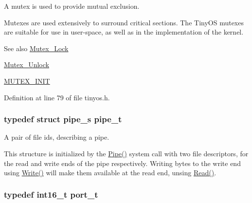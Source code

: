 A mutex is used to provide mutual exclusion. 

Mutexes are used extensively to surround critical sections. The Tiny\+OS mutexes are suitable for use in user-\/space, as well as in the implementation of the kernel.

\begin{DoxySeeAlso}{See also}
\hyperlink{group__syscalls_ga1140be44df71d39edaf6a7262fb763ca}{Mutex\+\_\+\+Lock} 

\hyperlink{group__syscalls_ga0b98d0315d0931d0c28104c36dd559c9}{Mutex\+\_\+\+Unlock} 

\hyperlink{group__syscalls_ga96be0bfc33e7e113099c7546798bec99}{M\+U\+T\+E\+X\+\_\+\+I\+N\+IT} 
\end{DoxySeeAlso}


Definition at line 79 of file tinyos.\+h.

\subsubsection[{\texorpdfstring{pipe\+\_\+t}{pipe_t}}]{\setlength{\rightskip}{0pt plus 5cm}typedef struct {\bf pipe\+\_\+s}  {\bf pipe\+\_\+t}}\hypertarget{group__syscalls_gad56b5ceaaf7d3ab88b4be7f622314dfb}{}\label{group__syscalls_gad56b5ceaaf7d3ab88b4be7f622314dfb}


A pair of file ids, describing a pipe. 

This structure is initialized by the {\ttfamily \hyperlink{group__syscalls_gab6355ce54e047c31538ed5ed9108b5b3}{Pipe()}} system call with two file descriptors, for the read and write ends of the pipe respectively. Writing bytes to the write end using {\ttfamily \hyperlink{group__syscalls_gaf046f003fde24f79fb395c250137856c}{Write()}} will make them available at the read end, unsing {\ttfamily \hyperlink{group__syscalls_ga3e9dc545a789eb45b2d356eabbac3ee3}{Read()}}. 
\subsubsection[{\texorpdfstring{port\+\_\+t}{port_t}}]{\setlength{\rightskip}{0pt plus 5cm}typedef int16\+\_\+t {\bf port\+\_\+t}}\hypertarget{group__syscalls_ga13894e5a2ffd5febb7aeb90e87239d61}{}\label{group__syscalls_ga13894e5a2ffd5febb7aeb90e87239d61}



